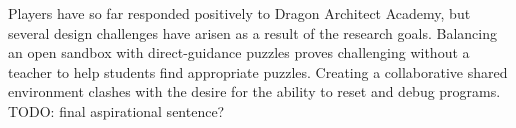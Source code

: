 \documentclass{sig-alternate}
\newcommand{\TODO}[1]{{\color{red} TODO: #1}}
\newcommand{\gametitle}{{\color{RoyalPurple} Dragon Architect Academy}}
\begin{document}
Players have so far responded positively to \gametitle{}, but several design challenges have arisen as a result of the research goals.
Balancing an open sandbox with direct-guidance puzzles proves challenging without a teacher to help students find appropriate puzzles.
Creating a collaborative shared environment clashes with the desire for the ability to reset and debug programs.
\TODO{final aspirational sentence?}



 
\end{document}
